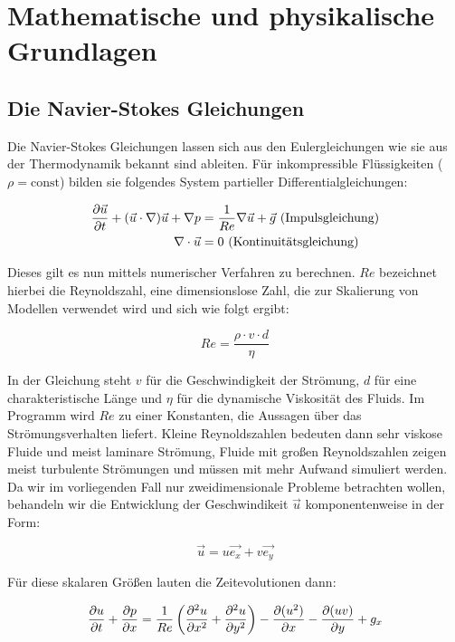 \section{Mathematische und physikalische Grundlagen} %
\label{sec:grundlagen}


	\subsection{Die Navier-Stokes Gleichungen} %
	\label{sub:die_navier_stokes_gleichungen}

		Die Navier-Stokes Gleichungen lassen sich aus den Eulergleichungen wie sie aus der Thermodynamik bekannt sind ableiten.
		Für inkompressible Flüssigkeiten ($\rho = \mathrm{const}$) bilden sie folgendes System partieller Differentialgleichungen:

		\begin{alignat*}{3}
			\frac{\partial \vec{u}}{\partial t}  + (\vec{u}\cdot\nabla)\vec{u} + \nabla p &= \frac{1}{Re} \nabla \vec{u} + \vec{g} \hfill\text{ (Impulsgleichung)} \\
			\nabla \cdot \vec{u} &= 0 \hfill \text{ (Kontinuitätsgleichung)}
		\end{alignat*}

		Dieses gilt es nun mittels numerischer Verfahren zu berechnen.
		$Re$ bezeichnet hierbei die Reynoldszahl, eine dimensionslose Zahl, die zur Skalierung von Modellen verwendet wird und sich wie folgt ergibt:

		\[ Re = \frac{\rho \cdot v \cdot d}{\eta} \]

		In der Gleichung steht $v$ für die Geschwindigkeit der Strömung, $d$ für eine charakteristische Länge und $\eta$ für die dynamische Viskosität des Fluids.
		Im Programm wird $Re$ zu einer Konstanten, die Aussagen über das Strömungsverhalten liefert.
		Kleine Reynoldszahlen bedeuten dann sehr viskose Fluide und meist laminare Strömung, Fluide mit großen Reynoldszahlen zeigen meist turbulente Strömungen und müssen mit mehr Aufwand simuliert werden.
		\\Da wir im vorliegenden Fall nur zweidimensionale Probleme betrachten wollen, behandeln wir die Entwicklung der Geschwindikeit $\vec{u}$ komponentenweise in der Form:

		\[ \vec{u} = u\vec{e_x} + v\vec{e_y} \]

		Für diese skalaren Größen lauten die Zeitevolutionen dann:

		\[ \frac{\partial u}{\partial t} + \frac{\partial p}{\partial x} = \frac{1}{Re} \left(  \frac{\partial ^{2} u}{\partial x ^{2}} + \frac{\partial ^{2} u}{\partial y ^{2}} \right) 
		- \frac{ \partial (u^{2}) }{ \partial x} - \frac{ \partial (uv) }{ \partial y} + g_x\]

